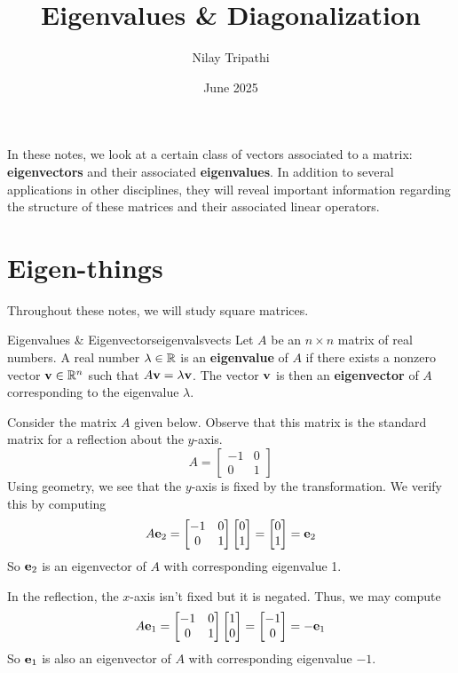 \documentclass[colorful]{notes}
\title{Eigenvalues \& Diagonalization}
\author{Nilay Tripathi }
\date{June 2025}
\begin{document}
    \maketitle
    
    In these notes, we look at a certain class of vectors associated to a matrix: \textbf{eigenvectors} and their associated \textbf{eigenvalues}. In addition to several applications in other disciplines, they will reveal important information regarding the structure of these matrices and their associated linear operators. 

    \section{Eigen-things}
    Throughout these notes, we will study square matrices. 
    \begin{cdefn}{Eigenvalues \& Eigenvectors}{eigenvalsvects}
        Let $A$ be an $n \times n$ matrix of real numbers. A real number $\lambda \in \mathbb{R}$ is an \textbf{eigenvalue} of $A$ if there exists a nonzero vector $\mathbf{v}\in \mathbb{R}^n$ such that $A \mathbf{v} = \lambda \mathbf{v}$. The vector $\mathbf{v}$ is then an \textbf{eigenvector} of $A$ corresponding to the eigenvalue $\lambda$.
    \end{cdefn}

    \begin{example}
        Consider the matrix $A$ given below. Observe that this matrix is the standard matrix for a reflection about the $y$-axis. 
        \begin{equation*}
            A = \begin{bmatrix}
                -1 & 0 \\ 
                0 & 1
            \end{bmatrix}
        \end{equation*}
        Using geometry, we see that the $y$-axis is fixed by the transformation. We verify this by computing 
        \begin{equation*}
            A\mathbf{e}_2 = \begin{bmatrix}
                -1 & 0 \\ 
                0 & 1
            \end{bmatrix} \begin{bmatrix} 0 \\ 1 \end{bmatrix} = \begin{bmatrix} 0 \\ 1 \end{bmatrix} = \mathbf{e}_2 
        \end{equation*}
        So $\mathbf{e}_2$ is an eigenvector of $A$ with corresponding eigenvalue 1. 

        In the reflection, the $x$-axis isn't fixed but it is negated. Thus, we may compute 
        \begin{equation*}
            A\mathbf{e}_1 = \begin{bmatrix}
                -1 & 0 \\ 
                0 & 1
            \end{bmatrix} \begin{bmatrix} 1 \\ 0 \end{bmatrix} = \begin{bmatrix} -1 \\ 0 \end{bmatrix} = -\mathbf{e}_1
        \end{equation*}
        So $\mathbf{e}_1$ is also an eigenvector of $A$ with corresponding eigenvalue $-1$.
    \end{example}
\end{document}
